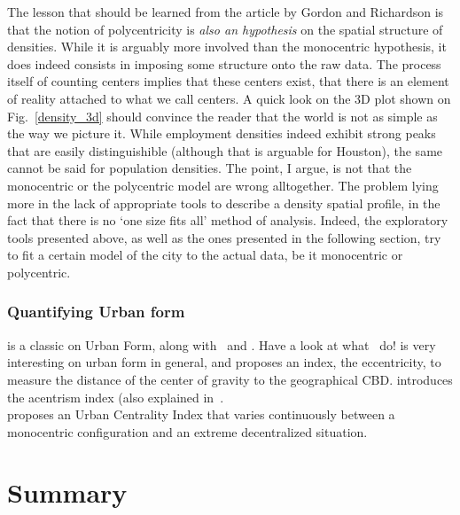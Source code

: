 The lesson that should be learned from the article by Gordon and Richardson is
that the notion of polycentricity is \emph{also an hypothesis} on the spatial
structure of densities. While it is arguably more involved than the monocentric
hypothesis, it does indeed consists in imposing some structure onto the raw
data. The process itself of counting centers implies that these centers exist,
that there is an element of reality attached to what we call centers. A quick
look on the 3D plot shown on Fig.~\ref{density_3d} should convince the reader
that the world is not as simple as the way we picture it. While employment
densities indeed exhibit strong peaks that are easily distinguishible (although
that is arguable for Houston), the same cannot be said for population densities.
The point, I argue, is not that the monocentric or the polycentric model are
wrong alltogether. The problem lying more in the lack of appropriate tools to
describe a density spatial profile, in the fact that there is no `one size fits
all' method of analysis. Indeed, the exploratory tools presented above, as well
as the ones presented in the following section, try to fit a certain model of
the city to the actual data, be it monocentric or polycentric.\\

\subsubsection{Quantifying Urban form}
\label{sub:urban_form}

\cite{Tsai:2005} is a classic on Urban Form, along with~\cite{LeNechet:2015} and
\cite{Schwarz:2010}.
Have a look at what~\cite{Berroir:2008} do!
\cite{Bertaud:2001} is very interesting on urban form in general, and proposes
an index, the eccentricity, to measure the distance of the center of gravity to
the geographical CBD.
\cite{LeNechet:2010} introduces the acentrism index (also explained
in~\cite{LeNechet:2015}.\\
\cite{Pereira:2013} proposes an Urban Centrality Index that varies continuously
between a monocentric configuration and an extreme decentralized situation.


\section{Summary}
\label{sec:summary}

